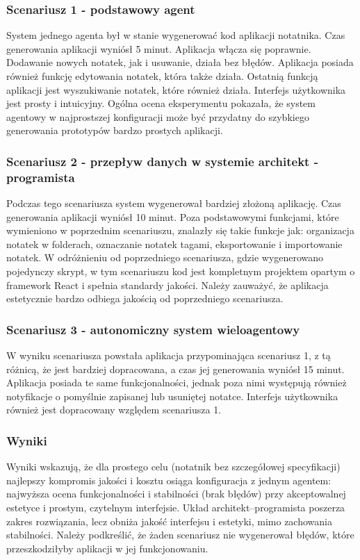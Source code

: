 \subsubsection*{Scenariusz 1 - podstawowy agent}
System jednego agenta był w stanie wygenerować kod aplikacji notatnika. Czas generowania aplikacji wyniósł 5 minut. Aplikacja włącza się poprawnie. Dodawanie nowych notatek, jak i usuwanie, działa bez błędów. Aplikacja posiada również funkcję edytowania notatek, która także działa. Ostatnią funkcją aplikacji jest wyszukiwanie notatek, które również działa. Interfejs użytkownika jest prosty i intuicyjny. Ogólna ocena eksperymentu pokazała, że system agentowy w najprostszej konfiguracji może być przydatny do szybkiego generowania prototypów bardzo prostych aplikacji.

\subsubsection*{Scenariusz 2 - przepływ danych w systemie architekt - programista}
Podczas tego scenariusza system wygenerował bardziej złożoną aplikację. Czas generowania aplikacji wyniósł 10 minut. Poza podstawowymi funkcjami, które wymieniono w poprzednim scenariuszu, znalazły się takie funkcje jak: organizacja notatek w folderach, oznaczanie notatek tagami, eksportowanie i importowanie notatek. W odróżnieniu od poprzedniego scenariusza, gdzie wygenerowano pojedynczy skrypt, w tym scenariuszu kod jest kompletnym projektem opartym o framework React i spełnia standardy jakości. Należy zauważyć, że aplikacja estetycznie bardzo odbiega jakością od poprzedniego scenariusza.

\subsubsection*{Scenariusz 3 - autonomiczny system wieloagentowy}
W wyniku scenariusza powstała aplikacja przypominająca scenariusz 1, z tą różnicą, że jest bardziej dopracowana, a czas jej generowania wyniósł 15 minut. Aplikacja posiada te same funkcjonalności, jednak poza nimi występują również notyfikacje o pomyślnie zapisanej lub usuniętej notatce. Interfejs użytkownika również jest dopracowany względem scenariusza 1.

\subsubsection*{Wyniki}
Wyniki wskazują, że dla prostego celu (notatnik bez szczegółowej specyfikacji) najlepszy kompromis jakości i kosztu osiąga konfiguracja z jednym agentem: najwyższa ocena funkcjonalności i stabilności (brak błędów) przy akceptowalnej estetyce i prostym, czytelnym interfejsie. Układ architekt–programista poszerza zakres rozwiązania, lecz obniża jakość interfejsu i estetyki, mimo zachowania stabilności. Należy podkreślić, że żaden scenariusz nie wygenerował błędów, które przeszkodziłyby aplikacji w jej funkcjonowaniu.

